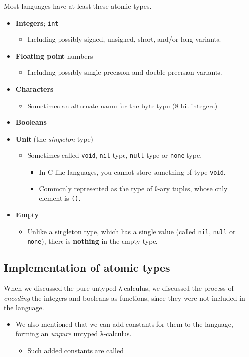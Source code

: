 \documentclass[11pt]{article}
\theoremstyle{definition}
\begin{document}
Most languages have at least these atomic types.
\begin{itemize}
\item \textbf{Integers}; \texttt{int}
\begin{itemize}
\item Including possibly signed, unsigned, short, and/or long variants.
\end{itemize}
\item \textbf{Floating point} numbers
\begin{itemize}
\item Including possibly single precision and double precision variants.
\end{itemize}
\item \textbf{Characters}
\begin{itemize}
\item Sometimes an alternate name for the byte type (8-bit integers).
\end{itemize}
\item \textbf{Booleans}
\item \textbf{Unit} (the \emph{singleton} type)
\begin{itemize}
\item Sometimes called \texttt{void}, \texttt{nil}-type, \texttt{null}-type or \texttt{none}-type.
\begin{itemize}
\item In C like languages, you cannot store something of type \texttt{void}.
\item Commonly represented as the type of 0-ary tuples,
whose only element is \texttt{()}.
\end{itemize}
\end{itemize}
\item \textbf{Empty}
\begin{itemize}
\item Unlike a singleton type, which has a single value
(called \texttt{nil}, \texttt{null} or \texttt{none}), there is \textbf{nothing} in the empty type.
\end{itemize}
\end{itemize}

\subsection{Implementation of atomic types}
\label{sec:org0e87217}

When we discussed the pure untyped λ-calculus,
we discussed the process of \emph{encoding} the integers and booleans
as functions, since they were not included in the language.
\begin{itemize}
\item We also mentioned that we can add constants for them
to the language, forming an \emph{unpure} untyped λ-calculus.
\begin{itemize}
\item Such added constants are called
\end{itemize}
\end{itemize}
\end{document}
